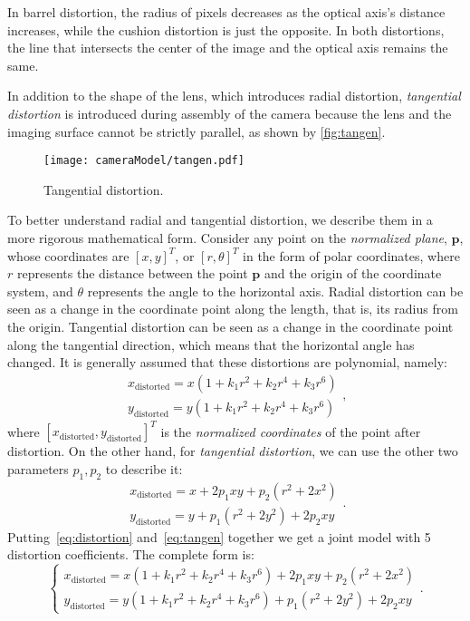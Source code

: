 In barrel distortion, the radius of pixels decreases as the optical axis's distance increases, while the cushion distortion is just the opposite. In both distortions, the line that intersects the center of the image and the optical axis remains the same.

In addition to the shape of the lens, which introduces radial distortion, \textit{tangential distortion} is introduced during assembly of the camera because the lens and the imaging surface cannot be strictly parallel, as shown by \autoref{fig:tangen}.

\begin{figure}[!t]
	\centering
	\texttt{[image: cameraModel/tangen.pdf]}
	\caption{Tangential distortion.}
	\label{fig:tangen}
\end{figure}
To better understand radial and tangential distortion, we describe them in a more rigorous mathematical form. Consider any point on the \textit{normalized plane}, $\mathbf{p}$, whose coordinates are $[x,y]^T$, or $[r, \theta]^T$ in the form of polar coordinates, where $r$ represents the distance between the point $\mathbf{p}$ and the origin of the coordinate system, and $\theta$ represents the angle to the horizontal axis. Radial distortion can be seen as a change in the coordinate point along the length, that is, its radius from the origin. Tangential distortion can be seen as a change in the coordinate point along the tangential direction, which means that the horizontal angle has changed. It is generally assumed that these distortions are polynomial, namely:
\begin{equation}
\label{eq:distortion} 
\begin{matrix}
x_\mathrm{distorted} = x(1+k_1r^2+k_2r^4+k_3r^6)\\
y_\mathrm{distorted} = y(1+k_1r^2+k_2r^4+k_3r^6)
\end{matrix},
\end{equation}
where $[x_\mathrm{distorted}, y_\mathrm{distorted}]^T$ is the \textit{normalized coordinates} of the point after distortion. On the other hand, for \textit{tangential distortion}, we can use the other two parameters $p_1,p_2$ to describe it:
\begin{equation}
\label{eq:tangen} 
\begin{matrix}
x_\mathrm{distorted} = x+2p_1xy+p_2(r^2+2x^2)\\
y_\mathrm{distorted} = y+p_1(r^2+2y^2)+2p_2xy
\end{matrix}. 
\end{equation}
Putting~\eqref{eq:distortion} and~\eqref{eq:tangen} together we get a joint model with 5 distortion coefficients. The complete form is:
\begin{equation}
\left\{\begin{matrix} x_\mathrm{distorted} =x(1+k_1r^2+k_2r^4+k_3r^6)+2p_1xy+p_2(r^2+2x^2)\\ 
y_\mathrm{distorted} = y(1+k_1r^2+k_2r^4+k_3r^6)+p_1(r^2+2y^2)+2p_2xy
\end{matrix}\right. .
\end{equation}

